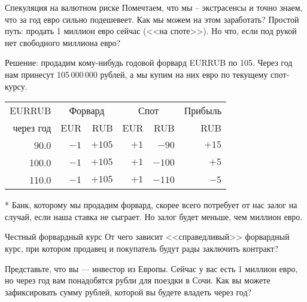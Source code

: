 \documentclass{beamer}
\begin{document}
\begin{frame}{Спекуляция на валютном риске}
\justify
Помечтаем, что мы -- экстрасенсы и точно знаем, что за год евро сильно подешевеет. Как мы можем на этом заработать? Простой путь: продать 1 миллион евро сейчас (<<на споте>>). Но что, если под рукой нет свободного миллиона евро?

\justify
Решение: продадим кому-нибудь годовой форвард EURRUB по 105. Через год нам принесут 105\,000\,000 рублей, а мы купим на них евро по текущему спот-курсу.

\justify
\centering
\begin{tabular}{r|r|r|r|r|r}
EURRUB      & \multicolumn{2}{c|}{Форвард} & \multicolumn{2}{c|}{Спот} & Прибыль \\
\cline{2-5}
через год & EUR     & RUB     & EUR     & RUB      & RUB \\ \hline
90.0      & $-1$ & $+105$  & $+1$  & $-90$  & $+15$ \\
100.0      & $-1$ & $+105$  & $+1$  & $-100$  & $+5$ \\
110.0     & $-1$ & $+105$  & $+1$   & $-110$ & $-5$ \\
\end{tabular}
 
\justify
* Банк, которому мы продадим форвард, скорее всего потребует от нас залог на случай, если наша ставка не сыграет. Но залог будет меньше, чем миллион евро.
\end{frame}



\begin{frame}{Честный форвардный курс}
\justify
От чего зависит <<справедливый>> форвардный курс, при котором продавец и покупатель будут рады заключить контракт? 

\justify
Представьте, что вы --- инвестор из Европы. Сейчас у вас есть 1 миллион евро, но через год вам понадобятся рубли для поездки в Сочи. Как вы можете зафиксировать сумму рублей, которой вы будете владеть через год? 
\end{frame}
\end{document}
